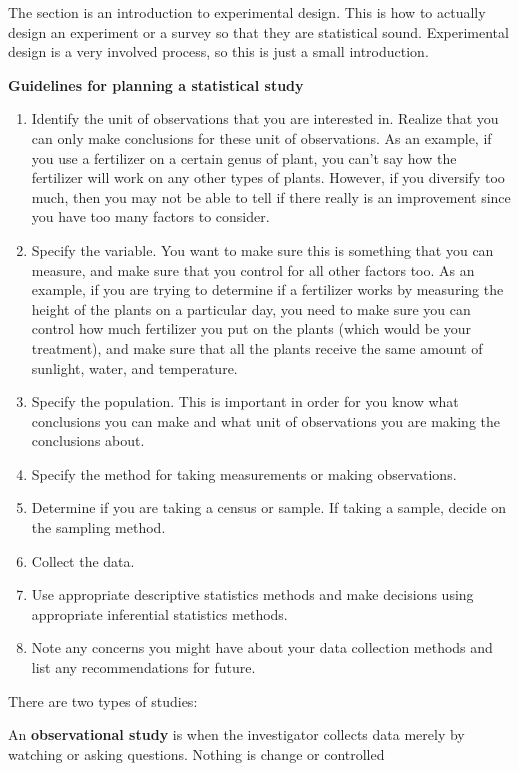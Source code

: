\documentclass[
]{book}
\begin{document}
The section is an introduction to experimental design. This is how to actually design an experiment or a survey so that they are statistical sound. Experimental design is a very involved process, so this is just a small introduction.

\textbf{Guidelines for planning a statistical study}

\begin{enumerate}
\def\labelenumi{\arabic{enumi}.}
\item
  Identify the unit of observations that you are interested in. Realize that you can only make conclusions for these unit of observations. As an example, if you use a fertilizer on a certain genus of plant, you can't say how the fertilizer will work on any other types of plants. However, if you diversify too much, then you may not be able to tell if there really is an improvement since you have too many factors to consider.
\item
  Specify the variable. You want to make sure this is something that you can measure, and make sure that you control for all other factors too. As an example, if you are trying to determine if a
  fertilizer works by measuring the height of the plants on a particular day, you need to make sure you can control how much fertilizer you put on the plants (which would be your treatment), and make sure that all the plants receive the same amount of sunlight, water, and temperature.
\item
  Specify the population. This is important in order for you know what conclusions you can make and what unit of observations you are making the conclusions about.
\item
  Specify the method for taking measurements or making observations.
\item
  Determine if you are taking a census or sample. If taking a sample, decide on the sampling method.
\item
  Collect the data.
\item
  Use appropriate descriptive statistics methods and make decisions using appropriate inferential statistics methods.
\item
  Note any concerns you might have about your data collection methods and list any recommendations for future.
\end{enumerate}

There are two types of studies:

An \textbf{observational study} is when the investigator collects data merely by watching or asking questions. Nothing is change or controlled
\end{document}
